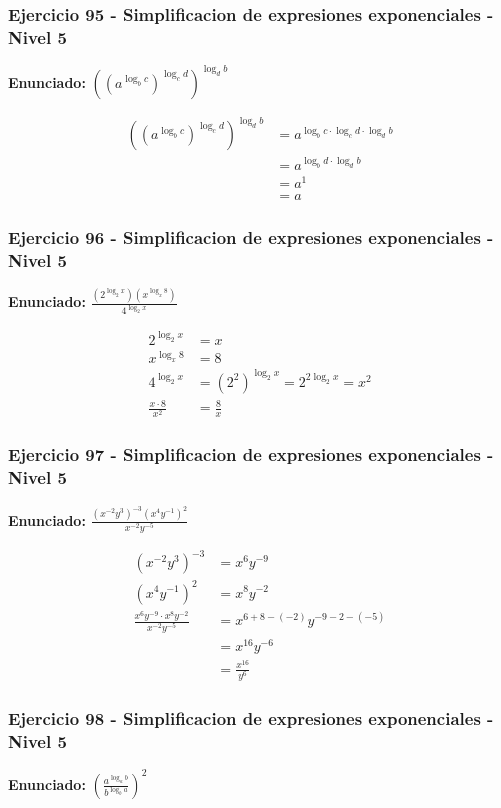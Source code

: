 \documentclass[12pt,a4paper]{article}
\begin{document}
\subsubsection*{Ejercicio 95 - Simplificacion de expresiones exponenciales - Nivel 5}
\textbf{Enunciado:} \(\left((a^{\log_b c})^{\log_c d}\right)^{\log_d b}\)

\[
\begin{aligned}
\left((a^{\log_b c})^{\log_c d}\right)^{\log_d b}&=a^{\log_b c\cdot\log_c d\cdot\log_d b}\\
&=a^{\log_b d\cdot\log_d b}\\
&=a^1\\
&=\boxed{a}
\end{aligned}
\]


\subsubsection*{Ejercicio 96 - Simplificacion de expresiones exponenciales - Nivel 5}
\textbf{Enunciado:} \(\frac{(2^{\log_2 x})(x^{\log_x 8})}{4^{\log_2 x}}\)

\[
\begin{aligned}
2^{\log_2 x}&=x\\
x^{\log_x 8}&=8\\
4^{\log_2 x}&=(2^2)^{\log_2 x}=2^{2\log_2 x}=x^2\\
\frac{x\cdot 8}{x^2}&=\boxed{\frac{8}{x}}
\end{aligned}
\]


\subsubsection*{Ejercicio 97 - Simplificacion de expresiones exponenciales - Nivel 5}
\textbf{Enunciado:} \(\frac{(x^{-2}y^3)^{-3}(x^4y^{-1})^2}{x^{-2}y^{-5}}\)

\[
\begin{aligned}
(x^{-2}y^3)^{-3}&=x^6y^{-9}\\
(x^4y^{-1})^2&=x^8y^{-2}\\
\frac{x^6y^{-9}\cdot x^8y^{-2}}{x^{-2}y^{-5}}&=x^{6+8-(-2)}y^{-9-2-(-5)}\\
&=x^{16}y^{-6}\\
&=\boxed{\frac{x^{16}}{y^6}}
\end{aligned}
\]


\subsubsection*{Ejercicio 98 - Simplificacion de expresiones exponenciales - Nivel 5}
\textbf{Enunciado:} \(\left(\frac{a^{\log_a b}}{b^{\log_b a}}\right)^2\)
\end{document}

